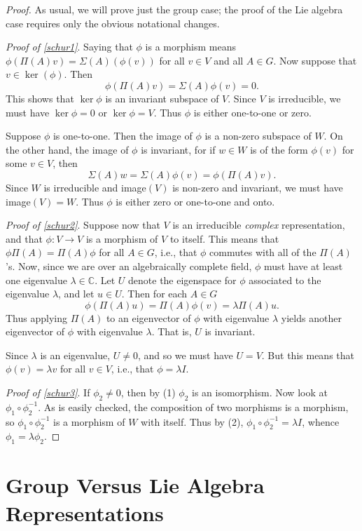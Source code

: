 \documentclass{amsbook}
\theoremstyle{plain}
\numberwithin{equation}{chapter}
\numberwithin{theorem}{chapter}
\begin{document}
\begin{proof}
As usual, we will prove just the group case; the proof of the Lie algebra case
requires only the obvious notational changes.

\textit{Proof of \ref{schur1}}. Saying that $\phi$ is a morphism means
$\phi(\Pi(A)v)=\Sigma(A)\left(  \phi(v)\right)  $ for all $v\in V$ and all
$A\in G$. Now suppose that $v\in\ker(\phi)$. Then
\[
\phi(\Pi(A)v)=\Sigma(A)\phi(v)=0\text{.}%
\]
This shows that $\ker\phi$ is an invariant subspace of $V$. Since $V$ is
irreducible, we must have $\ker\phi=0$ or $\ker\phi=V$. Thus $\phi$ is either
one-to-one or zero.

Suppose $\phi$ is one-to-one. Then the image of $\phi$ is a non-zero subspace
of $W$. On the other hand, the image of $\phi$ is invariant, for if $w\in W$
is of the form $\phi(v)$ for some $v\in V$, then
\[
\Sigma(A)w=\Sigma(A)\phi(v)=\phi(\Pi(A)v)\text{.}%
\]
Since $W$ is irreducible and image$(V)$ is non-zero and invariant, we must
have image$(V)=W$. Thus $\phi$ is either zero or one-to-one and onto.

\textit{Proof of \ref{schur2}}. Suppose now that $V$ is an irreducible
\textit{complex} representation, and that $\phi:V\rightarrow V$ is a morphism
of $V$ to itself. This means that $\phi\Pi(A)=\Pi(A)\phi$ for all $A\in G$,
i.e., that $\phi$ commutes with all of the $\Pi(A)$'s. Now, since we are over
an algebraically complete field, $\phi$ must have at least one eigenvalue
$\lambda\in\mathbb{C}$. Let $U$ denote the eigenspace for $\phi$ associated to
the eigenvalue $\lambda$, and let $u\in U$. Then for each $A\in G$%
\[
\phi\left(  \Pi(A)u\right)  =\Pi(A)\phi(v)=\lambda\Pi(A)u\text{.}%
\]
Thus applying $\Pi(A)$ to an eigenvector of $\phi$ with eigenvalue $\lambda$
yields another eigenvector of $\phi$ with eigenvalue $\lambda$. That is, $U$
is invariant.

Since $\lambda$ is an eigenvalue, $U\neq0$, and so we must have $U=V$. But
this means that $\phi(v)=\lambda v$ for all $v\in V$, i.e., that $\phi=\lambda
I$.

\textit{Proof of \ref{schur3}}. If $\phi_{2}\neq0$, then by (1) $\phi_{2}$ is
an isomorphism. Now look at $\phi_{1}\circ\phi_{2}^{-1}$. As is easily
checked, the composition of two morphisms is a morphism, so $\phi_{1}\circ
\phi_{2}^{-1}$ is a morphism of $W$ with itself. Thus by (2), $\phi_{1}%
\circ\phi_{2}^{-1}=\lambda I$, whence $\phi_{1}=\lambda\phi_{2}$.
\end{proof}

\section{Group Versus Lie Algebra Representations\label{group.algebra}}
\end{document}
